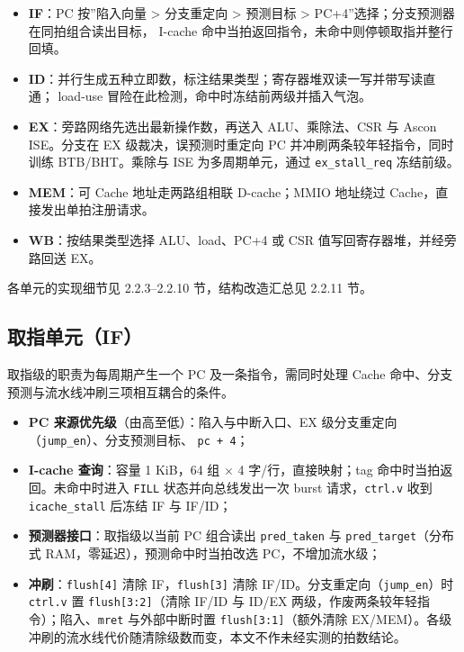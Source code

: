 
\begin{itemize}
\tightlist
\item
  \textbf{IF}：PC 按''陷入向量 \textgreater{} 分支重定向 \textgreater{} 预测目标 \textgreater{} PC+4''选择；分支预测器在同拍组合读出目标， I-cache 命中当拍返回指令，未命中则停顿取指并整行回填。
\item
  \textbf{ID}：并行生成五种立即数，标注结果类型；寄存器堆双读一写并带写读直通； load-use 冒险在此检测，命中时冻结前两级并插入气泡。
\item
  \textbf{EX}：旁路网络先选出最新操作数，再送入 ALU、乘除法、CSR 与 Ascon ISE。分支在 EX 级裁决，误预测时重定向 PC 并冲刷两条较年轻指令，同时训练 BTB/BHT。乘除与 ISE 为多周期单元，通过 \texttt{ex\_\allowbreak{}stall\_\allowbreak{}req} 冻结前级。
\item
  \textbf{MEM}：可 Cache 地址走两路组相联 D-cache；MMIO 地址绕过 Cache，直接发出单拍注册请求。
\item
  \textbf{WB}：按结果类型选择 ALU、load、PC+4 或 CSR 值写回寄存器堆，并经旁路回送 EX。
\end{itemize}

各单元的实现细节见 2.2.3--2.2.10 节，结构改造汇总见 2.2.11 节。

\Needspace{85pt}

\subsection{取指单元（IF）}\label{ux53d6ux6307ux5355ux5143if}

取指级的职责为每周期产生一个 PC 及一条指令，需同时处理 Cache 命中、分支预测与流水线冲刷三项相互耦合的条件。

\begin{itemize}
\tightlist
\item
  \textbf{PC 来源优先级}（由高至低）：陷入与中断入口、EX 级分支重定向（\texttt{jump\_\allowbreak{}en}）、分支预测目标、 \texttt{pc\ +\ 4}；
\item
  \textbf{I-cache 查询}：容量 1 KiB，64 组 $\times$ 4 字/行，直接映射；tag 命中时当拍返回。未命中时进入 \texttt{FILL} 状态并向总线发出一次 burst 请求，\texttt{ctrl.\allowbreak{}v} 收到 \texttt{icache\_\allowbreak{}stall} 后冻结 IF 与 IF/ID；
\item
  \textbf{预测器接口}：取指级以当前 PC 组合读出 \texttt{pred\_\allowbreak{}taken} 与 \texttt{pred\_\allowbreak{}target}（分布式 RAM，零延迟），预测命中时当拍改选 PC，不增加流水级；
\item
  \textbf{冲刷}：\texttt{flush{[}4{]}} 清除 IF，\texttt{flush{[}3{]}} 清除 IF/ID。分支重定向（\texttt{jump\_\allowbreak{}en}）时 \texttt{ctrl.\allowbreak{}v} 置 \texttt{flush{[}3:2{]}}（清除 IF/ID 与 ID/EX 两级，作废两条较年轻指令）；陷入、\texttt{mret} 与外部中断时置 \texttt{flush{[}3:1{]}}（额外清除 EX/MEM）。各级冲刷的流水线代价随清除级数而变，本文不作未经实测的拍数结论。
\end{itemize}

